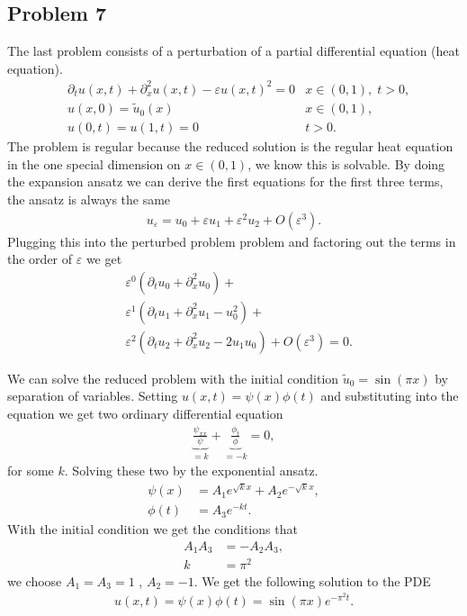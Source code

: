 \documentclass[a4paper]{article}
\newcommand{\eps}{\varepsilon}
\begin{document}
\subsection{Problem 7}
The last problem consists of a perturbation of a partial differential
equation (heat equation).
\begin{align}
    &\partial_t u(x, t) + \partial_x^2 u(x,t) - \eps u(x, t)^2 = 0
    &x\in (0, 1),\; t>0,\\
    &u(x, 0) = \tilde{u}_0(x)  &x\in(0, 1), \\
    &u(0, t) = u(1, t) = 0 & t>0.
\end{align}
The problem is regular because the reduced solution is the regular heat
equation in the one special dimension on $x\in (0, 1)$, we know this is
solvable. By doing the expansion ansatz we can derive the first equations
for the first three terms, the ansatz is always the same
\begin{align}
    u_\eps = u_0 + \eps u_1 + \eps^2 u_2 + O(\eps^3).
\end{align}
Plugging this into the perturbed problem problem and factoring out the terms
in the order of $\eps$ we get
\begin{align}
    &\eps^0 (\partial_t u_0 + \partial_x^2 u_0) + \\
    &\eps^1 (\partial_t u_1 + \partial_x^2 u_1 - u_0^2) +\\
    &\eps^2 (\partial_t u_2 + \partial_x^2 u_2 - 2u_1u_0)  + O(\eps^3) = 0.
\end{align}

We can solve the reduced problem with the initial condition $\tilde{u}_0 =
\sin(\pi x)$ by separation of variables. Setting $u(x, t) = \psi(x) \phi(t)$
and substituting into the equation we get two ordinary differential equation
\begin{align}
    \underbrace{\frac{\psi_{xx}}{\psi}}_{=k}
    +\underbrace{\frac{\phi_t}{\phi}}_{=-k} =  0,
\end{align}
for some $k$. Solving these two by the exponential ansatz.
\begin{align}
    \psi(x) &= A_1 e^{\sqrt{k} x} +A_2 e^{-\sqrt{k} x},\\
    \phi(t) &= A_3 e^{-kt}.
\end{align}
With the initial condition we get the conditions that
\begin{align}
    A_1A_3 &= -A_2 A_3,\\
    k &= \pi^2
\end{align}
we choose $A_1 = A_3 = 1$ , $A_2 = -1$. We get the following solution to the
PDE
\begin{align}
    u(x, t) = \psi(x)\phi(t) = \sin(\pi x) e^{-\pi^2 t}.
\end{align}

\end{document}
